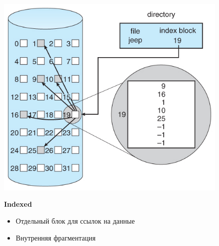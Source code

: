 \documentclass[../../lectures.tex]{subfiles}
\begin{document}
\begin{figure}[H]
\captionsetup{singlelinecheck=off}
\begin{minipage}[c]{0.5\linewidth}
\centering
\includegraphics[width=\textwidth]{images/indexed-allocation.jpg}
\end{minipage}
\hspace{0.5cm}
\begin{minipage}[c]{0.5\linewidth}
\centering
\textbf{Indexed}
\begin{itemize}
    \item Отдельный блок для ссылок на данные
    \item Внутренняя фрагментация
\end{itemize}
\end{minipage}
\end{figure}
\end{document}

